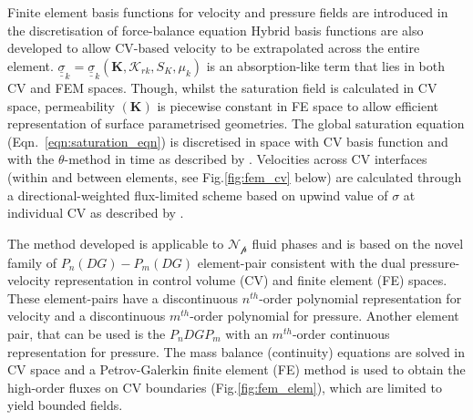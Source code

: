 \documentclass[preprint,authoryear,12pt]{elsarticle}
\begin{document}





\medskip
Finite element basis functions for velocity and pressure fields are introduced in the discretisation of force-balance equation %
Hybrid basis functions are also developed to allow CV-based velocity to be extrapolated across the entire element. $\underline{\underline{\sigma}}_{k}=\underline{\underline{\sigma}}_{k}\left({\mathbf K}, \mathcal{K}_{rk}, S_{K}, \mu_{k}\right)$ is an absorption-like term that lies in both CV and FEM spaces. Though, whilst the saturation field is calculated in CV space, permeability $\left({\mathbf K}\right)$ is piecewise constant in FE space to allow efficient representation of surface parametrised geometries. The global saturation equation (Eqn.~\ref{eqn:saturation_eqn}) is discretised in space with CV basis function and with the $\theta$-method in time as described by \citet{gomes_book_2012}. Velocities across CV interfaces (within and between elements, see Fig.\ref{fig:fem_cv} below) are calculated through a directional-weighted flux-limited scheme based on upwind value of $\sigma$ at individual CV as described by \citet{jackson_2013}.

\medskip
The method developed is applicable to $\mathcal{N_{p}}$ fluid phases and is based on the novel family of $P_{n}(DG)-P_{m}(DG)$ element-pair consistent with the dual pressure-velocity representation in control volume (CV) and finite element (FE) spaces. These element-pairs have a discontinuous $n^{th}$-order polynomial representation for velocity and a discontinuous $m^{th}$-order polynomial for pressure. Another element pair, that can be used is the $P_{n}DGP_{m}$ with an $m^{th}$-order continuous representation for pressure. The mass balance (continuity) equations are solved in CV space and a Petrov-Galerkin finite element (FE) method is used to obtain the high-order fluxes on CV boundaries (Fig.\ref{fig:fem_elem}), which are limited to yield bounded fields.
\end{document}
